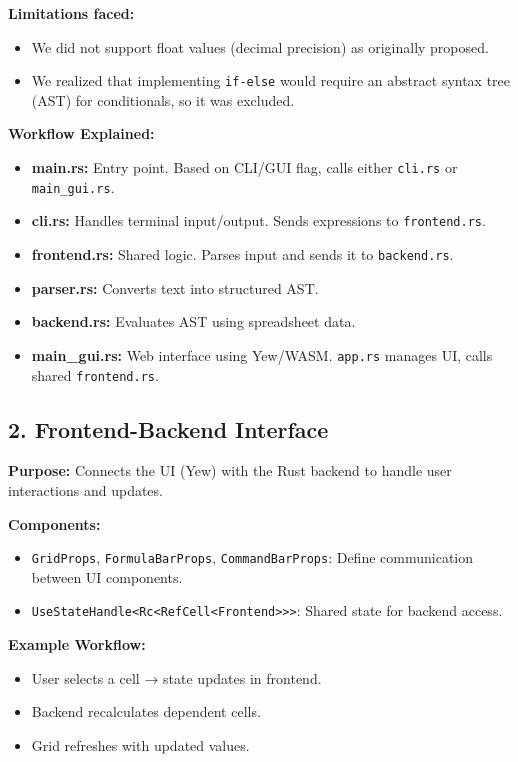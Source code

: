 \documentclass{article}
\begin{document}
\textbf{Limitations faced:}
\begin{itemize}
    \item We did not support float values (decimal precision) as originally proposed.
    \item We realized that implementing \texttt{if-else} would require an abstract syntax tree (AST) for conditionals, so it was excluded.
\end{itemize}

\textbf{Workflow Explained:}
\begin{itemize}
    \item \textbf{main.rs:} Entry point. Based on CLI/GUI flag, calls either \texttt{cli.rs} or \texttt{main\_gui.rs}.
    \item \textbf{cli.rs:} Handles terminal input/output. Sends expressions to \texttt{frontend.rs}.
    \item \textbf{frontend.rs:} Shared logic. Parses input and sends it to \texttt{backend.rs}.
    \item \textbf{parser.rs:} Converts text into structured AST.
    \item \textbf{backend.rs:} Evaluates AST using spreadsheet data.
    \item \textbf{main\_gui.rs:} Web interface using Yew/WASM. \texttt{app.rs} manages UI, calls shared \texttt{frontend.rs}.
\end{itemize}

\subsection*{2. Frontend-Backend Interface}
\textbf{Purpose:} Connects the UI (Yew) with the Rust backend to handle user interactions and updates.

\textbf{Components:}
\begin{itemize}
    \item \texttt{GridProps}, \texttt{FormulaBarProps}, \texttt{CommandBarProps}: Define communication between UI components.
    \item \texttt{UseStateHandle<Rc<RefCell<Frontend>>>}: Shared state for backend access.
\end{itemize}

\textbf{Example Workflow:}
\begin{itemize}
    \item User selects a cell → state updates in frontend.
    \item Backend recalculates dependent cells.
    \item Grid refreshes with updated values.
\end{itemize}
\end{document}
